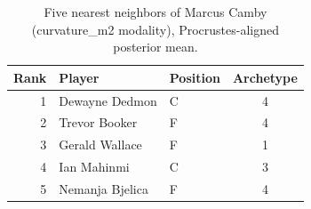 \begin{table}[htbp]
  \centering\small
  \begin{tabular}{rllc}
    \toprule
    Rank & Player & Position & Archetype \\
    \midrule
    1 & Dewayne Dedmon & C & 4 \\
    2 & Trevor Booker & F & 4 \\
    3 & Gerald Wallace & F & 1 \\
    4 & Ian Mahinmi & C & 3 \\
    5 & Nemanja Bjelica & F & 4 \\
    \bottomrule
  \end{tabular}
  \caption{Five nearest neighbors of Marcus Camby (curvature_m2 modality), Procrustes-aligned posterior mean.}
  \label{tab:Marcus_Camby_neighbors_curvature_m2}
\end{table}

